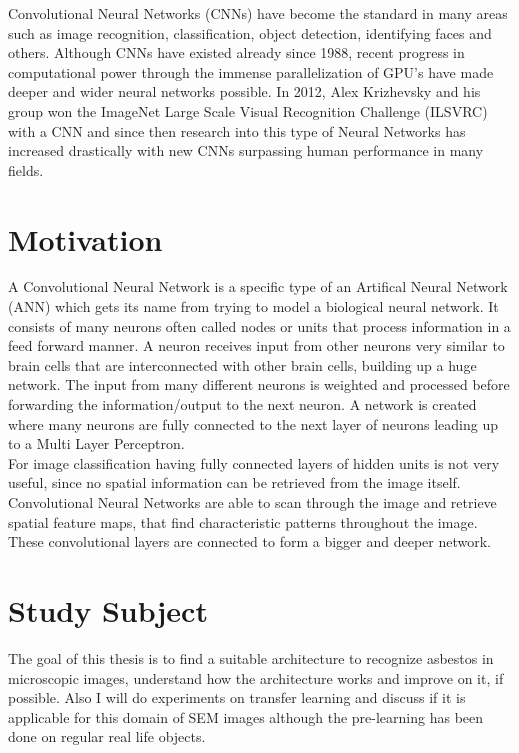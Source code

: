Convolutional Neural Networks (CNNs) have become the standard in many areas such as image recognition, classification, object detection, identifying faces and others. Although CNNs have existed already since 1988, recent progress in computational power through the immense parallelization of GPU's have made deeper and wider neural networks possible. In 2012, Alex Krizhevsky and his group won the ImageNet Large Scale Visual Recognition Challenge (ILSVRC) with a CNN and since then research into this type of Neural Networks has increased drastically with new CNNs surpassing human performance in many fields. \\

\section{Motivation}

A Convolutional Neural Network is a specific type of an Artifical Neural Network (ANN) which gets its name from trying to model a biological neural network. It consists of many neurons often called nodes or units that process information in a feed forward manner. A neuron receives input from other neurons very similar to brain cells that are interconnected with other brain cells, building up a huge network. The input from many different neurons is weighted and processed before forwarding the information/output to the next neuron. A network is created where many neurons are fully connected to the next layer of neurons leading up to a Multi Layer Perceptron. \\

For image classification having fully connected layers of hidden units is not very useful, since no spatial information can be retrieved from the image itself. Convolutional Neural Networks are able to scan through the image and retrieve spatial feature maps, that find characteristic patterns throughout the image. These convolutional layers are connected to form a bigger and deeper network.  \\

\section{Study Subject}

The goal of this thesis is to find a suitable architecture to recognize asbestos in microscopic images, understand how the architecture works and improve on it, if possible. Also I will do experiments on transfer learning and discuss if it is applicable for this domain of SEM images although the pre-learning has been done on regular real life objects. \\

